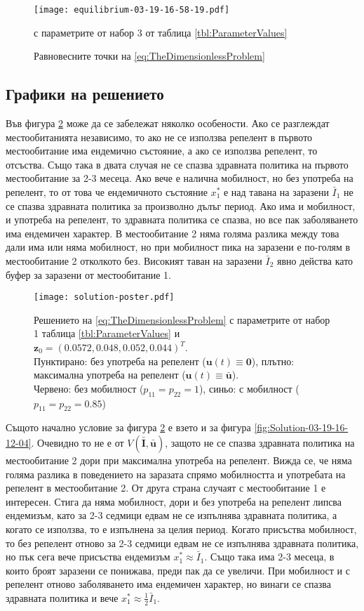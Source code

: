 \begin{figure}[H]
  \centering
  \texttt{[image: equilibrium-03-19-16-58-19.pdf]}
  \caption{Равновесните точки на \eqref{eq:TheDimensionlessProblem}} с параметрите от набор 3 от таблица \ref{tbl:ParameterValues}
  \label{fig:EquilibriumPoints-03-19-16-58-19}
\end{figure}

\subsection{Графики на решението}
Във фигура \ref{fig:Solution-poster} може да се забележат няколко особености.
Ако се разглеждат местообитанията независимо, то ако не се използва репелент в първото местообитание има ендемично състояние, а ако се използва репелент, то отсъства.
Също така в двата случая не се спазва здравната политика на първото местообитание за 2-3 месеца.
Ако вече е налична мобилност, но без употреба на репелент, то от това че ендемичното състояние $x_1^*$ е над тавана на заразени $\bar{I}_1$ не се спазва здравната политика за произволно дълъг период.
Ако има и мобилност, и употреба на репелент, то здравната политика се спазва, но все пак заболяването има ендемичен характер.
В местообитание 2 няма голяма разлика между това дали има или няма мобилност, но при мобилност пика на заразени е по-голям в местообитание 2 отколкото без. Високият таван на заразени $\bar{I}_2$ явно действа като буфер за заразени от местообитание 1.

\begin{figure}[H]
  \centering
  \texttt{[image: solution-poster.pdf]}
  \caption{Решението на \eqref{eq:TheDimensionlessProblem} с параметрите от набор 1 таблица \ref{tbl:ParameterValues} и $\mathbf{z}_0=(0.0572, 0.048, 0.052, 0.044)^T$.\\
    Пунктирано: без употреба на репелент ($\mathbf{u}(t) \equiv \mathbf{0}$), плътно: максимална употреба на репелент ($\mathbf{u}(t) \equiv \bar{\mathbf{u}}$).\\
  Червено: без мобилност ($p_{11}=p_{22}=1$), синьо: с мобилност ($p_{11}=p_{22}=0.85$)}
  \label{fig:Solution-poster}
\end{figure}

Същото начално условие за фигура \ref{fig:Solution-poster} е взето и за фигура \ref{fig:Solution-03-19-16-12-04}.
Очевидно то не е от $V(\bar{\mathbf{I}}, \bar{\mathbf{u}})$, защото не се спазва здравната политика на местообитание 2 дори при максимална употреба на репелент.
Вижда се, че няма голяма разлика в поведението на заразата спрямо мобилността и употребата на репелент в местообитание 2.
От друга страна случаят с местообитание 1 е интересен.
Стига да няма мобилност, дори и без употреба на репелент липсва ендемизъм, като за 2-3 седмици едвам не се изпълнява здравната политика, а когато се използва, то е изпълнена за целия период.
Когато присъства мобилност, то без репелент отново за 2-3 седмици едвам не се изпълнява здравната политика, но пък сега вече присъства ендемизъм $x_1^* \approx \bar{I}_1$.
Също така има 2-3 месеца, в които броят заразени се понижава, преди пак да се увеличи.
При мобилност и с репелент отново заболяването има ендемичен характер, но винаги се спазва здравната политика и вече $x_1^* \approx \frac{1}{2}\bar{I}_1$.

